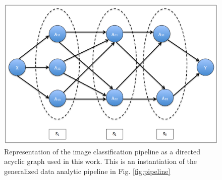 
\begin{figure}[ht!]
    \centering
    \includegraphics[scale=0.3]{img/EP/pipeline}
    \caption{Representation of the image classification pipeline as a directed acyclic graph used in this work. This is an instantiation of the generalized data analytic pipeline in Fig. \ref{fig:pipeline}}
    \label{fig:images_pipeline}
\end{figure}

